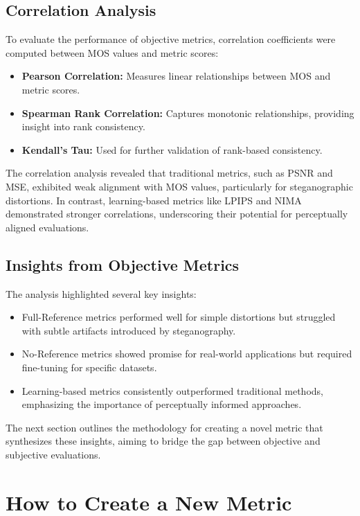 \subsection{Correlation Analysis}

To evaluate the performance of objective metrics, correlation coefficients were computed between MOS values and metric scores:
\begin{itemize}
    \item \textbf{Pearson Correlation:} Measures linear relationships between MOS and metric scores.
    \item \textbf{Spearman Rank Correlation:} Captures monotonic relationships, providing insight into rank consistency.
    \item \textbf{Kendall’s Tau:} Used for further validation of rank-based consistency.
\end{itemize}

The correlation analysis revealed that traditional metrics, such as PSNR and MSE, exhibited weak alignment with MOS values, particularly for steganographic distortions. In contrast, learning-based metrics like LPIPS and NIMA demonstrated stronger correlations, underscoring their potential for perceptually aligned evaluations.

\subsection{Insights from Objective Metrics}

The analysis highlighted several key insights:
\begin{itemize}
    \item Full-Reference metrics performed well for simple distortions but struggled with subtle artifacts introduced by steganography.
    \item No-Reference metrics showed promise for real-world applications but required fine-tuning for specific datasets.
    \item Learning-based metrics consistently outperformed traditional methods, emphasizing the importance of perceptually informed approaches.
\end{itemize}

The next section outlines the methodology for creating a novel metric that synthesizes these insights, aiming to bridge the gap between objective and subjective evaluations.

\section{How to Create a New Metric}

